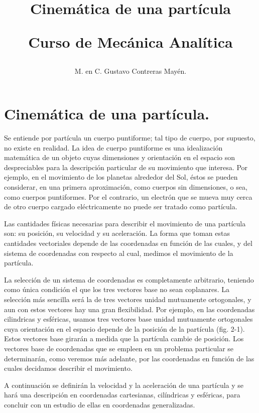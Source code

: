 \documentclass[12pt]{article}
\title{Cinemática de una partícula \\ \begin{Large} Curso de Mecánica Analítica \end{Large}}
\author{M. en C. Gustavo Contreras Mayén.}
\date{ }
\begin{document}
\maketitle
\fontsize{14}{14}\selectfont

\tableofcontents

\newpage

\section{Cinemática de una partícula.}

Se entiende por partícula un cuerpo puntiforme; tal tipo de cuerpo, por supuesto, no existe en realidad. La idea de cuerpo puntiforme es una idealización matemática de un objeto cuyas dimensiones y orientación en el espacio son despreciables para la descripción particular de su movimiento que interesa. Por ejemplo, en el movimiento de los planetas alrededor del Sol, éstos se pueden considerar, en una primera aproximación, como cuerpos sin dimensiones, o sea, como cuerpos puntiformes. Por el contrario, un electrón que se mueva muy cerca de otro cuerpo cargado eléctricamente no puede ser tratado como partícula.
\par
Las cantidades físicas necesarias para describir el movimiento de una partícula son: su posición, su velocidad y su aceleración. La forma que toman estas cantidades vectoriales depende de las coordenadas en función de las cuales, y del sistema de coordenadas con respecto al cual, medimos el movimiento de la partícula.
\par
La selección de un sistema de coordenadas es completamente arbitrario, teniendo como única condición el que los tres vectores base no sean coplanares. La selección más sencilla será la de tres vectores unidad mutuamente ortogonales, y aun con estos vectores hay una gran flexibilidad. Por ejemplo, en las coordenadas cilindricas y esféricas, usamos tres vectores base unidad mutuamente ortogonales cuya orientación en el espacio depende de la posición de la partícula (fig. 2-1). Estos vectores base girarán a medida que la partícula cambie de posición. Los vectores base de coordenadas que se empleen en un problema particular se determinarán, como veremos más adelante, por las coordenadas en función de las cuales decidamos describir 
el movimiento.
\par
A continuación se definirán la velocidad y la aceleración de una partícula y se hará una descripción en coordenadas cartesianas, cilíndricas y esféricas, para concluir con un estudio de ellas en coordenadas generalizadas.
\end{document}
